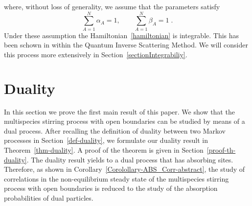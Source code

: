 \documentclass[10pt]{article}
\numberwithin{equation}{section}
\numberwithin{equation}{subsection}
\begin{document}
where, without loss of generality,  we assume that the parameters satisfy
\begin{equation}\label{ratesConditions}
	\sum_{A=1}^{N}\alpha_{A}=1,\qquad\sum_{A=1}^{N}\beta_{A}=1\;.
\end{equation} 
Under these assumption the Hamiltonian~\ref{hamiltonian} is integrable. This has been schown in \cite{vanicat2017exact} within  the Quantum Inverse Scattering Method.  We will consider this process more extensively in Section~\ref{sectionIntegrabiliy}.

\section{Duality}\label{sectionDuality}
In this section we prove the first main result of this paper. We show that the multispecies stirring process with open boundaries
can be studied by means of a dual process. After recalling the definition of duality between two
Markov processes in Section~\ref{def-duality}, we formulate our duality result  in Theorem~\ref{thm-duality}. A proof of the theorem is given in Section~\ref{proof-th-duality}.
The duality result yields {\color{blue} to a dual process that} %
 has absorbing sites. Therefore, as shown in Corollary~\ref{Corolollary-ABS_Corr-abstract}, the study of correlations in the non-equilibrium steady state of the multispecies stirring process with open boundaries
is reduced to the study of the absorption probabilities of dual particles.
\end{document}
